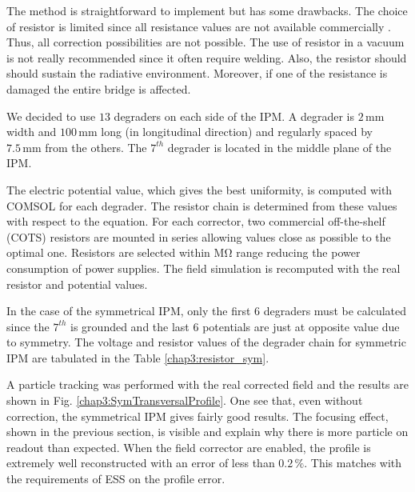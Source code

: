 \begin{refsection}
	

	The method is straightforward to implement but has some drawbacks. The choice of resistor is limited since all resistance values are not available commercially \cite{Vishay2012}. Thus, all correction possibilities are not possible. The use of resistor in a vacuum is not really recommended since it often require welding. Also, the resistor should should sustain the radiative environment. Moreover, if one of the resistance is damaged the entire bridge is affected.

	We decided to use $13$ degraders on each side of the IPM. A degrader is $2\,\mathrm{mm}$ width and $100\,\mathrm{mm}$ long (in longitudinal direction) and regularly spaced by $7.5\,\mathrm{mm}$ from the others. The $7^{th}$ degrader is located in the middle plane of the IPM.

	The electric potential value, which gives the best uniformity, is computed with COMSOL for each degrader. The resistor chain is determined from these values with respect to the equation. For each corrector, two commercial off-the-shelf (COTS) resistors are mounted in series allowing values close as possible to the optimal one. Resistors are selected within $\mathrm{M\Omega}$ range reducing the power consumption of power supplies. The field simulation is recomputed with the real resistor and potential values.

	In the case of the symmetrical IPM, only the first $6$ degraders must be calculated since the $7^{th}$ is grounded and the last $6$ potentials are just at opposite value due to symmetry. The voltage and resistor values of the degrader chain for symmetric IPM are tabulated in the Table \ref{chap3:resistor_sym}.

	

	A particle tracking was performed with the real corrected field and the results are shown in Fig. \ref{chap3:SymTransversalProfile}. One see that, even without correction, the symmetrical IPM gives fairly good results. The focusing effect, shown in the previous section, is visible and explain why there is more particle on readout than expected. When the field corrector are enabled, the profile is extremely well reconstructed with an error of less than $0.2\,\mathrm{\%}$.  This matches with the requirements of ESS on the profile error.

	


\end{refsection}
